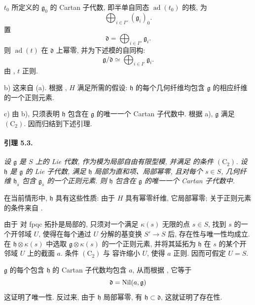 \(t_0\) 所定义的 \(\mathfrak g_0\) 的 Cartan 子代数, 即半单自同态 \(\operatorname{ad}(t_0)\) 的核, 为
\[
  \bigoplus_{i\in I''}(\mathfrak g_i)_0.
\]
置
\[
  \mathfrak d=\bigoplus_{i\in I''}\mathfrak g_i.
\]
则 \(\operatorname{ad}(t)\) 在 \(\mathfrak d\) 上幂零, 并为下述模的自同构:
\[
  \mathfrak g/\mathfrak d
  \simeq\bigoplus_{i\in I'}\mathfrak g_i.
\]
由 , \(t\) 正则.

\smallskip
\noindent
\textup{b)}
这来自 \textup{(a)}. 根据 , \(H\) 满足所需的假设: \(\mathfrak h\) 的每个几何纤维均包含 \(\mathfrak g\) 的相应纤维的一个正则元素.

\smallskip
\noindent
\textup{c)}
由 b), 只须表明 \(\mathfrak h\) 包含在 \(\mathfrak g\) 的唯一一个 Cartan 子代数中. 根据 a), \(\mathfrak g\) 满足 \((\mathrm C_2)\). 因而归结到下述引理.

\paragraph{\textbf{引理 5.3.}}
{\itshape 设 \(\mathfrak g\) 是 \(S\) 上的 Lie 代数, 作为模为局部自由有限型模, 并满足  的条件 \((\mathrm C_2)\). 设 \(\mathfrak h\) 是 \(\mathfrak g\) 的 Lie 子代数, 满足 \(\mathfrak h\) 局部为直和项、局部幂零, 且对每个 \(s\in S\), 几何纤维 \(\mathfrak h_{\bar s}\) 包含 \(\mathfrak g_{\bar s}\) 的一个正则元素. 则 \(\mathfrak h\) 包含在 \(\mathfrak g\) 的唯一一个 Cartan 子代数中.}

在当前情形中, \(\mathfrak h\) 具有这些性质: 由于 \(H\) 具有幂零纤维, 它局部幂零; 关于正则元素的条件来自 .

由于  对 fpqc 拓扑是局部的, 只须对一个满足 \(\kappa(s)\) 无限的点 \(s\in S\), 找到 \(s\) 的一个开邻域 \(U\), 使得在每个通过 \(U\) 分解的基变换 \(S'\to S\) 后, 存在性与唯一性均成立. 在 \(\mathfrak h\otimes\kappa(s)\) 中选取 \(\mathfrak g\otimes\kappa(s)\) 的一个正则元素, 并将其延拓为 \(\mathfrak h\) 在 \(s\) 的某个开邻域 \(U\) 上的截面 \(a\). 条件 \((\mathrm C_2)\) 与  容许缩小 \(U\), 使得 \(a\) 正则. 因而可假定 \(U=S\).

\(\mathfrak g\) 的每个包含 \(\mathfrak h\) 的 Cartan 子代数均包含 \(a\), 从而根据 , 它等于
\[
  \mathfrak d=\operatorname{Nil}(a,\mathfrak g)
\]
这证明了唯一性. 反过来, 由于 \(\mathfrak h\) 局部幂零, 有 \(\mathfrak h\subset\mathfrak d\), 这就证明了存在性.

